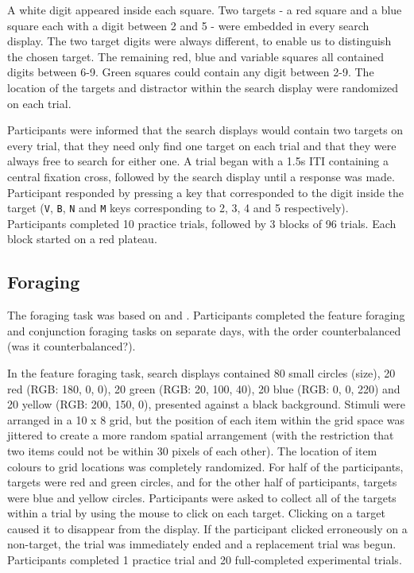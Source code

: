 \documentclass[a4paper, oneside, 11pt, onecolumn]{article}
\begin{document}
A white digit appeared inside each square. Two targets - a red square and a blue square each with a digit between 2 and 5 - were embedded in every search display. The two target digits were always different, to enable us to distinguish the chosen target. The remaining red, blue and variable squares all contained digits between 6-9. Green squares could contain any digit between 2-9. The location of the targets and distractor within the search display were randomized on each trial.

Participants were informed that the search displays would contain two targets on every trial, that they need only find one target on each trial and that they were always free to search for either one. A trial began with a 1.5s ITI containing a central fixation cross, followed by the search display until a response was made. Participant responded by pressing a key that corresponded to the digit inside the target (\texttt{V}, \texttt{B}, \texttt{N} and \texttt{M} keys corresponding to 2, 3, 4 and 5 respectively). Participants completed 10 practice trials, followed by 3 blocks of 96 trials. Each block started on a red plateau.  


\subsection{Foraging}

The foraging task was based on \cite{kristjansson2014} and \cite{johannesson2016}. Participants completed the feature foraging and conjunction foraging tasks on separate days, with the order counterbalanced (was it counterbalanced?).

In the feature foraging task, search displays contained 80 small circles (size), 20 red (RGB: 180, 0, 0), 20 green (RGB: 20, 100, 40), 20 blue (RGB: 0, 0, 220) and 20 yellow (RGB: 200, 150, 0), presented against a black background. Stimuli were arranged in a 10 x 8 grid, but the position of each item within the grid space was jittered to create a more random spatial arrangement (with the restriction that two items could not be within 30 pixels of each other). The location of item colours to grid locations was completely randomized. 
For half of the participants, targets were red and green circles, and for the other half of participants, targets were blue and yellow circles. Participants were asked to collect all of the targets within a trial by using the mouse to click on each target. Clicking on a target caused it to disappear from the display. If the participant clicked erroneously on a non-target, the trial was immediately ended and a replacement trial was begun. Participants completed 1 practice trial and 20 full-completed experimental trials.
\end{document}
